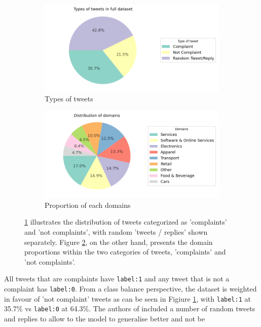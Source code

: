 \begin{figure}[htbp]
    \centering
    \captionsetup{font=small}
    \begin{subfigure}{0.49\textwidth}
        \centering
        \includegraphics[width=\linewidth]{figures/compl_non_random_dist.png}
        \caption{Types of tweets}
        \label{fig: compl_non_random_dist}
    \end{subfigure}
    \hfill
    \begin{subfigure}{0.49\textwidth}
        \centering
        \includegraphics[width=\linewidth]{figures/domain_dist.png}
        \caption{Proportion of each domains}
        \label{fig: domain_dist}
    \end{subfigure}
    \caption{ \ref{fig: compl_non_random_dist} illustrates the distribution of tweets categorized as 'complaints' and 'not complaints', with random 'tweets / replies' shown separately. Figure \ref{fig: domain_dist}, on the other hand, presents the domain proportions within the two categories of tweets, 'complaints' and 'not complaints'.}
    \label{fig: compl_main_dist}
\end{figure}

All tweets that are complaints have \texttt{label:1} and any tweet that is not a complaint has \texttt{label:0}. From a class balance perspective, the dataset is weighted in favour of 'not complaint' tweets as can be seen in Figiure \ref{fig: compl_non_random_dist}, with \texttt{label:1} at 35.7\% vs \texttt{label:0} at 64.3\%. The authors of \cite{preotiuc-pietro_automatically_2019} included a number of random tweets and replies to allow to the model to generalise better and not be 

